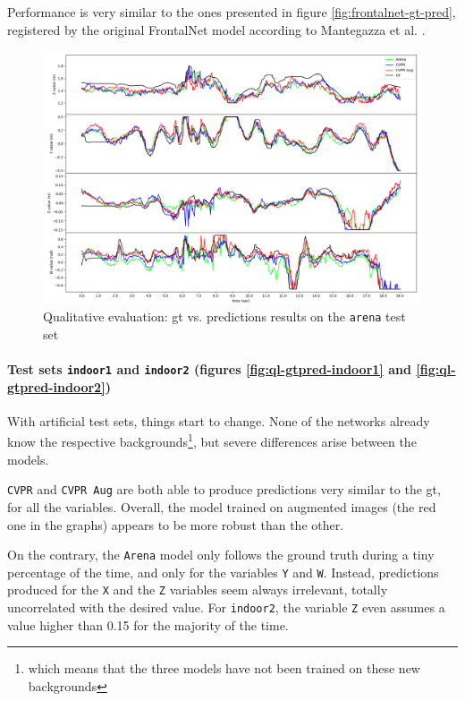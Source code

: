 Performance is very similar to the ones presented in figure \ref{fig:frontalnet-gt-pred}, registered by the original FrontalNet model according to Mantegazza et al. \cite{mantegazza2019visionbased}.

\begin{figure}[!h]
	\centering
	\includegraphics[width=1 \textwidth]{"contents/images/06-gtpred-arena"}
	\caption[Qualitative evaluation: \gls{gt} vs. predictions results on the \texttt{arena} test set]{Qualitative evaluation: \gls{gt} vs. predictions results on the \texttt{arena} test set}
	\label{fig:ql-gtpred-arena}
\end{figure}


\paragraph*{Test sets \texttt{indoor1} and \texttt{indoor2} (figures \ref{fig:ql-gtpred-indoor1} and \ref{fig:ql-gtpred-indoor2})}

With artificial test sets, things start to change. None of the networks already know the respective backgrounds\footnote{which means that the three models have not been trained on these new backgrounds}, but severe differences arise between the models. 

\texttt{CVPR} and \texttt{CVPR Aug} are both able to produce predictions very similar to the \gls{gt}, for all the variables. Overall, the model trained on augmented images (the red one in the graphs) appears to be more robust than the other.

On the contrary, the \texttt{Arena} model only follows the ground truth during a tiny percentage of the time, and only for the variables \texttt{Y} and \texttt{W}. Instead, predictions produced for the \texttt{X} and the \texttt{Z} variables seem always irrelevant, totally uncorrelated with the desired value. For \texttt{indoor2}, the variable \texttt{Z} even assumes a value higher than 0.15 for the majority of the time.

